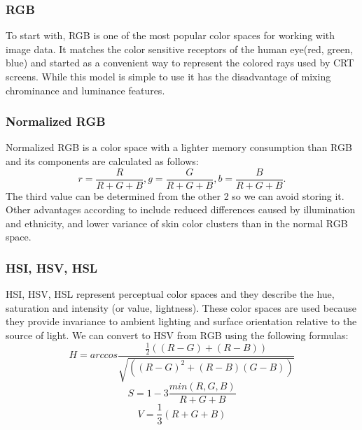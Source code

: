 \documentclass[12pt]{report}
\begin{document}
	\subsubsection{RGB}
	To start with, RGB is one of the most popular color spaces for working with image data. It matches the color sensitive receptors of the human eye(red, green, blue) and started as a convenient way to represent the colored rays used by CRT screens\cite{survey_color_detection_techniques}. While this model is simple to use it has the disadvantage of mixing chrominance and luminance features\cite{survey_color_detection_techniques}.
	
	\subsubsection{Normalized RGB}
	Normalized RGB is a color space with a lighter memory consumption than RGB and its components are calculated as follows\cite{survey_color_detection_techniques}: 
	\begin{equation}
	r = \frac{R}{R + G + B}, g = \frac{G}{R + G + B}, b = \frac{B}{R + G + B}.
	\end{equation}
	The third value can be determined from the other 2 so we can avoid storing it. Other advantages according to \cite{survey_skin_color_modeling} include reduced differences caused by illumination and ethnicity, and lower variance of skin color clusters than in the normal RGB space.
	
	\subsubsection{HSI, HSV, HSL}
	HSI, HSV, HSL represent perceptual color spaces and they describe the hue, saturation and intensity (or value, lightness). These color spaces are used because they provide invariance to ambient lighting and surface orientation relative to the source of light\cite{survey_skin_color_modeling}. We can convert to HSV from RGB using the following formulas\cite{survey_color_detection_techniques}:
	\begin{equation}
	H = arccos\frac{\frac{1}{2}((R - G) + (R - B))}{\sqrt{((R - G)^2 + (R - B)(G - B))}}
	\end{equation}
	\begin{equation}
	S = 1 - 3 \frac{min(R, G, B)}{R + G + B}
	\end{equation}
	\begin{equation}
	V = \frac{1}{3}(R + G + B)
	\end{equation}
\end{document}
